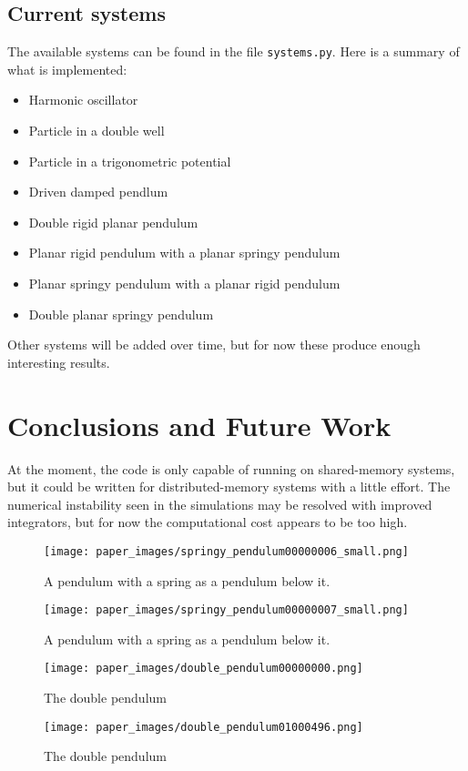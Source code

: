 \documentclass{article}
\begin{document}
\subsection{Current systems}
The available systems can be found in the file \texttt{systems.py}. Here is a summary of what is implemented:
\begin{itemize}
\item Harmonic oscillator
\item Particle in a double well
\item Particle in a trigonometric potential
\item Driven damped pendlum
\item Double rigid planar pendulum
\item Planar rigid pendulum with a planar springy pendulum
\item Planar springy pendulum with a planar rigid pendulum
\item Double planar springy pendulum
\end{itemize}

Other systems will be added over time, but for now these produce enough interesting results.

\section{Conclusions and Future Work}
At the moment, the code is only capable of running on shared-memory systems, but it could be written for distributed-memory systems with a little effort. The numerical instability seen in the simulations may be resolved with improved integrators, but for now the computational cost appears to be too high.




\appendix
\begin{figure}
\centering
\texttt{[image: paper\_images/springy\_pendulum00000006\_small.png]} 
\caption{A pendulum with a spring as a pendulum below it.}
\end{figure}

\begin{figure}
\centering
\texttt{[image: paper\_images/springy\_pendulum00000007\_small.png]} 
\caption{A pendulum with a spring as a pendulum below it.}
\end{figure}

\begin{figure}
\centering
\texttt{[image: paper\_images/double\_pendulum00000000.png]}
\caption{The double pendulum}
\end{figure}
\begin{figure}
\centering
\texttt{[image: paper\_images/double\_pendulum01000496.png]}
\caption{The double pendulum}
\end{figure}
\end{document}
